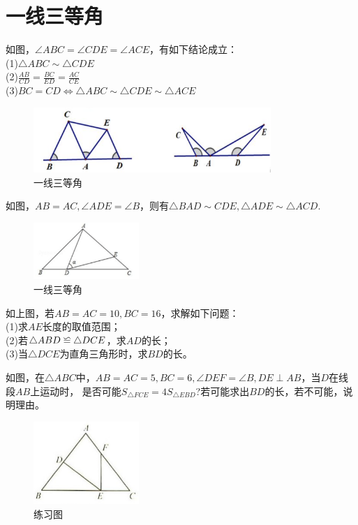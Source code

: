 \documentclass{ecnuthesis}
\newcommand\backcong{\mathrel{\reflectbox{$\cong$}}}
\begin{document}
\section{一线三等角}
\begin{model}
    如图，$\angle ABC=\angle CDE=\angle ACE$，有如下结论成立：\\
    (1)$\triangle ABC\sim \triangle CDE$ \\
    (2)$\frac{AB}{CD}=\frac{BC}{ED}=\frac{AC}{CE}$ \\
    (3)$BC=CD \Leftrightarrow \triangle ABC \sim \triangle CDE \sim \triangle ACE$
\end{model}
\begin{figure}[H]
\centering
\includegraphics[width=9cm]{picture/858.png}
\caption{一线三等角}
\end{figure}
\begin{model}
    如图，$AB=AC,\angle ADE=\angle B$，则有$\triangle BAD \sim CDE,\triangle ADE \sim \triangle ACD.$
\end{model}
\begin{figure}[H]
\centering
\includegraphics[width=4cm]{picture/831.png}
\caption{一线三等角}
\end{figure}
\begin{problem}
    如上图，若$AB=AC=10,BC=16$，求解如下问题：\\
    (1)求$AE$长度的取值范围；\\
    (2)若$\triangle ABD \backcong \triangle DCE$，求$AD$的长；\\
    (3)当$\triangle DCE$为直角三角形时，求$BD$的长。
\end{problem}
\begin{problem}
    如图，在$\triangle ABC$中，$AB=AC=5,BC=6,\angle DEF=\angle B,DE\perp AB$，当$D$在线段$AB$上运动时，
    是否可能$S_{\triangle FCE}=4S_{\triangle EBD}$?若可能求出$BD$的长，若不可能，说明理由。
\end{problem}
\begin{figure}[H]
\centering
\includegraphics[width=4cm]{picture/832.png}
\caption{练习图}
\end{figure}
\clearpage
\end{document}
